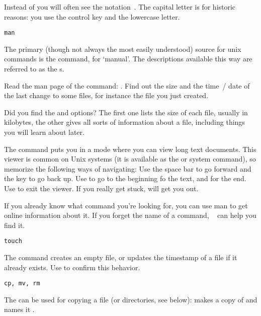 \begin{remark}
  Instead of  you will often see the notation~. 
  The capital letter is for historic reasons: you use the control key
  and the lowercase letter.
\end{remark}

 {\texttt{man}}

The primary (though not always the most easily understood) source for unix commands
is the  command, for `manual'.
The descriptions available this way are referred to as the s.

\begin{exercise}
  Read the man page of the  command:
  .
  Find out the size and the time~/ date of the last change
  to some files, for instance the file you just created.
\end{exercise}
\begin{outcome}
  Did you find the  and  options? The first one
  lists the size of each file, usually in kilobytes, the other gives
  all sorts of information about a file, including things you will
  learn about later.
\end{outcome}

The  command
    puts you in a mode where you can view long text documents. This
    viewer is common on Unix systems (it is available as the  or
     system command), so memorize the following ways of navigating: Use
    the space bar to go forward and the  key to go back up. Use
     to go to the beginning fo the text, and  for the end. Use
     to exit the viewer. If you really get stuck,  will
    get you out.

\begin{remark}
  If you already know what command you're looking for, you can use man
  to get online information about it. If you forget the name of a
  command, ~ can help you find it.
\end{remark}

 {\texttt{touch}}

The  command creates an empty file, or updates the timestamp of
a file if it already exists. Use  to confirm this behavior.

 {\texttt{cp, mv, rm}}

The  can be used for copying a file (or directories,
see below):  makes a copy of  and names it
.

